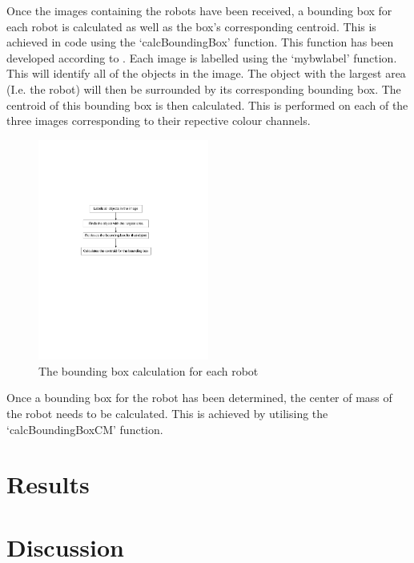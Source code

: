 \documentclass{article}
\begin{document}
Once the images containing the robots have been received, a bounding box for each robot is calculated as well as the box's corresponding centroid. This is achieved in code using the `calcBoundingBox' function. This function has been developed according to . Each image is labelled using the `mybwlabel' function. This will identify all of the objects in the image. The object with the largest area (I.e. the robot) will then be surrounded by its corresponding bounding box. The centroid of this bounding box is then calculated. This is performed on each of the three images corresponding to their repective colour channels.

\begin{figure}[h!] 
  \centering
    \includegraphics[width=0.5\textwidth]{../Drawings/boundingbox.pdf}
    \caption{The bounding box calculation for each robot }
    \label{fig:bounding}
\end{figure}

Once a bounding box for the robot has been determined, the center of mass of the robot needs to be calculated. This is achieved by utilising the `calcBoundingBoxCM' function.


\section{Results}
\label{sec:results}


\section{Discussion}
\label{sec:discussion}
\end{document}
